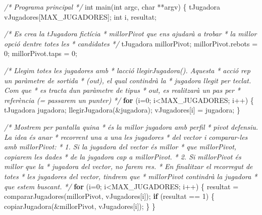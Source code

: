 \documentclass[]{book}
\newenvironment{Shaded}{\begin{snugshade}}{\end{snugshade}}
\newcommand{\CommentTok}[1]{\textcolor[rgb]{0.56,0.35,0.01}{\textit{#1}}}
\newcommand{\ControlFlowTok}[1]{\textcolor[rgb]{0.13,0.29,0.53}{\textbf{#1}}}
\newcommand{\DataTypeTok}[1]{\textcolor[rgb]{0.13,0.29,0.53}{#1}}
\newcommand{\DecValTok}[1]{\textcolor[rgb]{0.00,0.00,0.81}{#1}}
\newcommand{\NormalTok}[1]{#1}
\begin{document}
\begin{Shaded}
\begin{Highlighting}[]
\CommentTok{/* Programa principal */}
\DataTypeTok{int}\NormalTok{ main(}\DataTypeTok{int}\NormalTok{ argc, }\DataTypeTok{char}\NormalTok{ **argv) \{}
\NormalTok{    tJugadora vJugadores[MAX\_JUGADORES];}
    \DataTypeTok{int}\NormalTok{ i, resultat;}

    \CommentTok{/* Es crea la tJugadora fictícia }
\CommentTok{     * millorPivot que ens ajudarà a trobar }
\CommentTok{     * la millor opció d\textquotesingle{}entre totes les }
\CommentTok{     * candidates}
\CommentTok{     */}
\NormalTok{    tJugadora millorPivot; }
\NormalTok{    millorPivot.rebots = }\DecValTok{0}\NormalTok{;}
\NormalTok{    millorPivot.taps = }\DecValTok{0}\NormalTok{;}

    \CommentTok{/* Llegim totes les jugadores amb }
\CommentTok{     * l\textquotesingle{}acció llegirJugadora(). Aquesta}
\CommentTok{     * acció rep un paràmetre de sortida}
\CommentTok{     * (out), el qual contindrà la }
\CommentTok{     * jugadora llegit per teclat. Com que}
\CommentTok{     * es tracta d\textquotesingle{}un paràmetre de tipus }
\CommentTok{     * out, es realitzarà un pas per }
\CommentTok{     * referència (= passarem un punter)}
\CommentTok{     */}
    \ControlFlowTok{for}\NormalTok{ (i=}\DecValTok{0}\NormalTok{; i\textless{}MAX\_JUGADORES; i++) \{}
\NormalTok{        tJugadora jugadora;}
\NormalTok{        llegirJugadora(\&jugadora);}
\NormalTok{        vJugadores[i] = jugadora;}
\NormalTok{    \}}

    \CommentTok{/* Mostrem per pantalla quina}
\CommentTok{     * és la millor jugadora amb perfil}
\CommentTok{     * pivot defensiu. La idea és anar}
\CommentTok{     * recorrent una a una les jugadores}
\CommentTok{     * del vector i comparar{-}les amb millorPivot:}
\CommentTok{     * 1. Si la jugadora del vector és millor}
\CommentTok{     * que millorPivot, copiarem les dades}
\CommentTok{     * de la jugadora cap a millorPivot.}
\CommentTok{     * 2. Si millorPivot és millor que la}
\CommentTok{     * jugadora del vector, no farem res.}
\CommentTok{     * En finalitzar el recorregut de totes}
\CommentTok{     * les jugadores del vector, tindrem que}
\CommentTok{     * millorPivot contindrà la jugadora}
\CommentTok{     * que estem buscant.}
\CommentTok{     */}
    \ControlFlowTok{for}\NormalTok{ (i=}\DecValTok{0}\NormalTok{; i\textless{}MAX\_JUGADORES; i++) \{}
\NormalTok{        resultat = compararJugadores(millorPivot, vJugadores[i]);}
        \ControlFlowTok{if}\NormalTok{ (resultat == }\DecValTok{1}\NormalTok{) \{}
\NormalTok{            copiarJugadora(\&millorPivot, vJugadores[i]);}
\NormalTok{        \}}
\NormalTok{    \}}


\end{Highlighting}
\end{Shaded}
\end{document}
